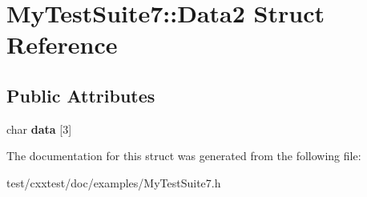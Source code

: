 \hypertarget{structMyTestSuite7_1_1Data2}{\section{My\-Test\-Suite7\-:\-:Data2 Struct Reference}
\label{structMyTestSuite7_1_1Data2}
}
\subsection*{Public Attributes}
\begin{DoxyCompactItemize}
\item 
\hypertarget{structMyTestSuite7_1_1Data2_a052d76148d14b1a757fe078506136bb7}{char {\bfseries data} \mbox{[}3\mbox{]}}\label{structMyTestSuite7_1_1Data2_a052d76148d14b1a757fe078506136bb7}

\end{DoxyCompactItemize}


The documentation for this struct was generated from the following file\-:\begin{DoxyCompactItemize}
\item 
test/cxxtest/doc/examples/My\-Test\-Suite7.\-h\end{DoxyCompactItemize}
